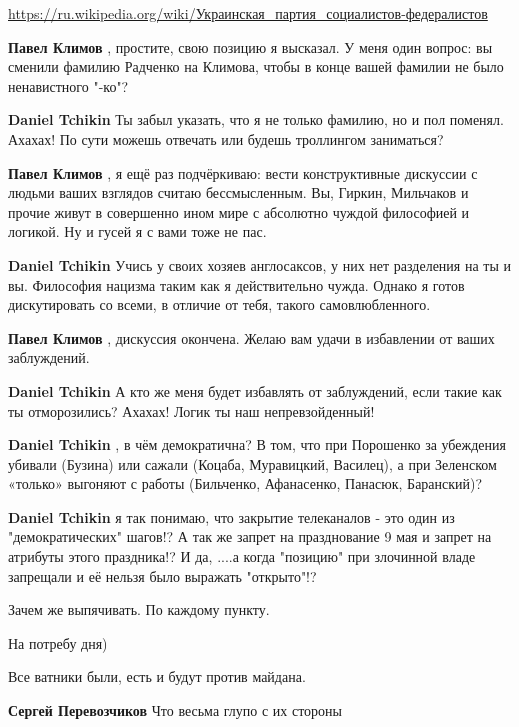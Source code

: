 \begin{itemize}
\begin{itemize}
\url{https://ru.wikipedia.org/wiki/Украинская_партия_социалистов-федералистов}

\textbf{Павел Климов} , простите, свою позицию я высказал.
У меня один вопрос: вы сменили фамилию Радченко на Климова, чтобы в конце вашей фамилии не было ненавистного "-ко"?

\textbf{Daniel Tchikin} Ты забыл указать, что я не только фамилию, но и пол поменял. Ахахах! По сути можешь отвечать или будешь троллингом заниматься?

\textbf{Павел Климов} , я ещё раз подчёркиваю: вести конструктивные дискуссии с людьми ваших взглядов считаю бессмысленным. Вы, Гиркин, Мильчаков и прочие живут в совершенно ином мире с абсолютно чуждой философией и логикой.
Ну и гусей я с вами тоже не пас.

\textbf{Daniel Tchikin} Учись у своих хозяев англосаксов, у них нет разделения на ты и вы. Философия нацизма таким как я действительно чужда. Однако я готов дискутировать со всеми, в отличие от тебя, такого самовлюбленного.

\textbf{Павел Климов} , дискуссия окончена. Желаю вам удачи в избавлении от ваших заблуждений.

\textbf{Daniel Tchikin} А кто же меня будет избавлять от заблуждений, если такие как ты отморозились? Ахахах! Логик ты наш непревзойденный!

\textbf{Daniel Tchikin} , в чём демократична? В том, что при Порошенко за убеждения убивали (Бузина) или сажали (Коцаба, Муравицкий, Василец), а при Зеленском «только» выгоняют с работы (Бильченко, Афанасенко, Панасюк, Баранский)?

\textbf{Daniel Tchikin} я так понимаю, что закрытие телеканалов - это один из "демократических" шагов!? А так же запрет на празднование 9 мая и запрет на атрибуты этого праздника!?
И да, ....а когда "позицию" при злочинной владе запрещали и её нельзя было выражать "открыто"!?

\end{itemize} %

Зачем же выпячивать. По каждому пункту.

На потребу дня)

Все ватники были, есть и будут против майдана.

\begin{itemize} %
\textbf{Сергей Перевозчиков} Что весьма глупо с их стороны


\end{itemize}
\end{itemize}
